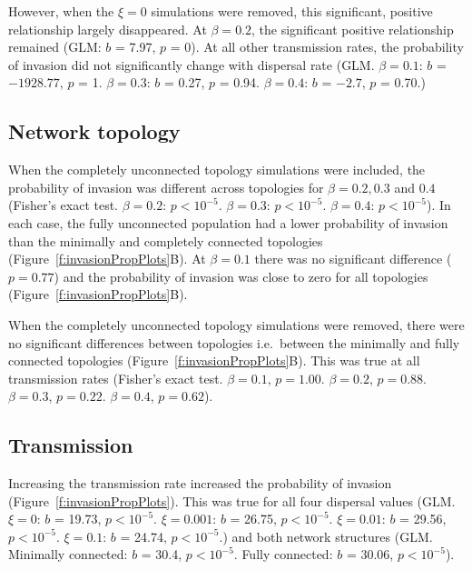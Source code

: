 However, when the $\xi = 0$ simulations were removed, this significant, positive relationship largely disappeared.
At $\beta = 0.2$, the significant positive relationship remained (GLM: $b$ = 7.97, $p$ = 0).
At all other transmission rates, the probability of invasion did not significantly change with dispersal rate (GLM. $\beta = 0.1$: $b$ = \ensuremath{-1928.77}, $p$ = 1. $\beta = 0.3$: $b$ = 0.27, $p$ = 0.94. $\beta = 0.4$: $b$ = \ensuremath{-2.7}, $p$ = 0.70.)


\subsection{Network topology}

When the completely unconnected topology simulations were included, the probability of invasion was different across topologies for $\beta = 0.2, 0.3$ and $0.4$ (Fisher's exact test. $\beta = 0.2$:  $p < 10^{-5}$. $\beta = 0.3$: $p < 10^{-5}$. $\beta = 0.4$:  $p < 10^{-5}$).
In each case, the fully unconnected population had a lower probability of invasion than the minimally and completely connected topologies (Figure~\ref{f:invasionPropPlots}B).
At $\beta = 0.1$ there was no significant difference ($p = 0.77$) and the probability of invasion was close to zero for all topologies (Figure~\ref{f:invasionPropPlots}B).

When the completely unconnected topology simulations were removed, there were no significant differences between topologies i.e.\ between the minimally and fully connected topologies (Figure~\ref{f:invasionPropPlots}B). 
This was true at all transmission rates (Fisher's exact test. $\beta = 0.1$, $p = 1.00$. $\beta = 0.2$,  $p = 0.88$. $\beta = 0.3$, $p = 0.22$. $\beta = 0.4$,  $p = 0.62$).



\subsection{Transmission}

Increasing the transmission rate increased the probability of invasion (Figure~\ref{f:invasionPropPlots}).
This was true for all four dispersal values (GLM. $\xi = 0$: $b$ = 19.73, $p < 10^{-5}$. $\xi = 0.001$: $b$ = 26.75, $p < 10^{-5}$. $\xi = 0.01$: $b$ = 29.56, $p < 10^{-5}$. $\xi = 0.1$: $b$ = 24.74, $p < 10^{-5}$.) and both network structures (GLM. Minimally connected: $b$ = 30.4, $p < 10^{-5}$. Fully connected: $b$ = 30.06, $p < 10^{-5}$).








